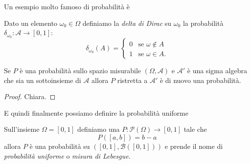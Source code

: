 \documentclass[11pt]{scrartcl}
\newcommand{\parti}[1]{\mathcal{P}\!\left(#1\right)}
\begin{document}
	Un esempio molto famoso di probabilità è
	\begin{definition}
		Dato un elemento $\omega_0\in \Omega$ definiamo la \textit{delta di Dirac} su $\omega_0$ la probabilità $\delta_{\omega_0}:\mathcal{A}\to[0,1] $:
		$$\delta_{\omega_0}(A)=
		\begin{cases}
			0 & \text{se $\omega\not\in A$} \\
			1 & \text{se $\omega\in A$.}
		\end{cases}$$ 
	\end{definition}
	\begin{proposition}
		Se $P$ è una probabilità sullo spazio misurabile $(\Omega,\mathcal{A})$ e $\mathcal{A}'$ è una sigma algebra che sia un sottoinsieme di $\mathcal{A}$ allora $P$ ristretta a $\mathcal{A}'$ è di nuovo una probabilità.
	\end{proposition}
	\begin{proof}
		Chiara.
	\end{proof}
	E quindi finalmente possiamo definire la probabilità uniforme
	\begin{definition}
		Sull'insieme $\Omega=[0,1]$ definiamo una $P:\parti{\Omega}\to[0,1]$ tale che
		$$P\left([a,b]\right)=b-a$$
		allora $P$ è una probabilità su $([0,1],\mathcal{B}([0,1]))$ e prende il nome di \textit{probabilità uniforme} o \textit{misura di Lebesgue}.
	\end{definition}
\end{document}

